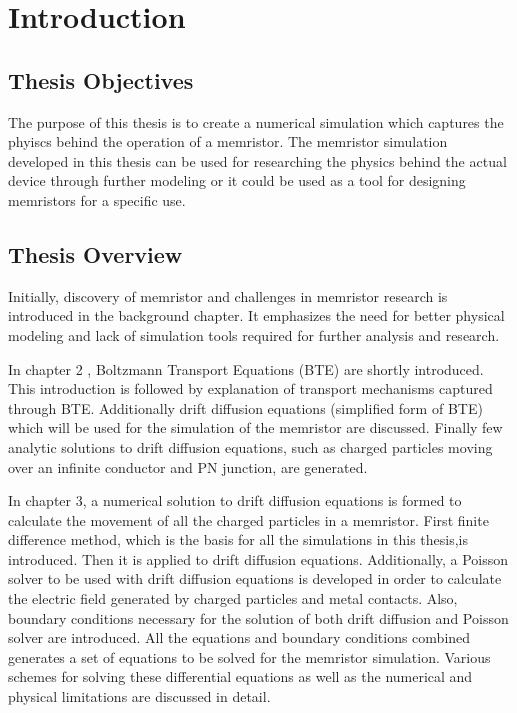 
\chapter{Introduction} %

\label{Chapter1} %


\section{Thesis Objectives}

The purpose of this thesis is to create a numerical simulation which captures the phyiscs behind the operation of a memristor. The memristor simulation developed in this thesis can be used for researching the physics behind the actual device through further modeling or it could be used as a tool for designing memristors for a specific use.

\section{Thesis Overview}

Initially, discovery of memristor and challenges in memristor research is introduced in the background chapter. It emphasizes the need for better physical modeling and lack of simulation tools required for further analysis and research.

In chapter 2 , Boltzmann Transport Equations (BTE) are shortly introduced. This introduction is followed by explanation of transport mechanisms captured through BTE. Additionally drift diffusion equations (simplified form of BTE) which will be used for the simulation of the memristor are discussed. Finally few analytic solutions to drift diffusion equations, such as charged particles moving over an infinite conductor and PN junction, are generated. 

In chapter 3, a numerical solution to drift diffusion equations is formed to calculate the movement of all the charged particles in a memristor. First finite difference method, which is the basis for all the simulations in this thesis,is introduced. Then it is applied to drift diffusion equations. Additionally, a Poisson solver to be used with drift diffusion equations is developed in order to calculate the electric field generated by charged particles and metal contacts. Also, boundary conditions necessary for the solution of both drift diffusion and Poisson solver are introduced. All the equations and boundary conditions combined generates a set of equations to be solved for the memristor simulation. Various schemes for solving these differential equations as well as the numerical and physical limitations are discussed in detail.
 
